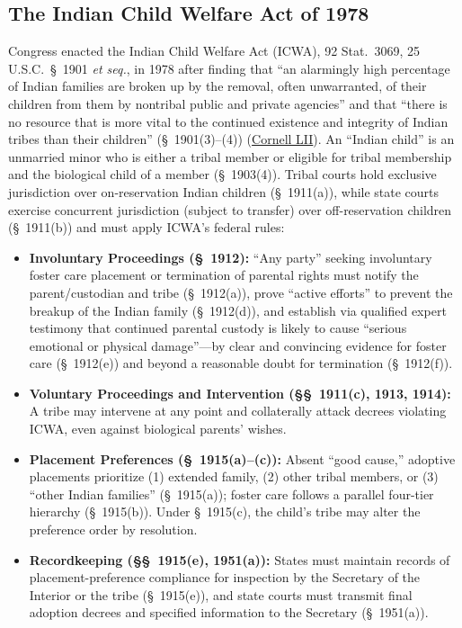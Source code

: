 \documentclass[12pt]{article}
\begin{document}
\subsection{The Indian Child Welfare Act of 1978}
Congress enacted the Indian Child Welfare Act (ICWA), 92 Stat.~3069, 25 U.S.C.~\S~1901 \textit{et seq.}, in 1978 after finding that ``an alarmingly high percentage of Indian families are broken up by the removal, often unwarranted, of their children from them by nontribal public and private agencies'' and that ``there is no resource that is more vital to the continued existence and integrity of Indian tribes than their children'' (\S~1901(3)--(4)) (\href{https://www.law.cornell.edu/supremecourt/text/21-376}{Cornell LII}). An ``Indian child'' is an unmarried minor who is either a tribal member or eligible for tribal membership and the biological child of a member (\S~1903(4)). Tribal courts hold exclusive jurisdiction over on-reservation Indian children (\S~1911(a)), while state courts exercise concurrent jurisdiction (subject to transfer) over off-reservation children (\S~1911(b)) and must apply ICWA's federal rules:
\begin{itemize}
    \item \textbf{Involuntary Proceedings (\S~1912):} ``Any party'' seeking involuntary foster care placement or termination of parental rights must notify the parent/custodian and tribe (\S~1912(a)), prove ``active efforts'' to prevent the breakup of the Indian family (\S~1912(d)), and establish via qualified expert testimony that continued parental custody is likely to cause ``serious emotional or physical damage''---by clear and convincing evidence for foster care (\S~1912(e)) and beyond a reasonable doubt for termination (\S~1912(f)).
    \item \textbf{Voluntary Proceedings and Intervention (\S\S~1911(c), 1913, 1914):} A tribe may intervene at any point and collaterally attack decrees violating ICWA, even against biological parents' wishes.
    \item \textbf{Placement Preferences (\S~1915(a)--(c)):} Absent ``good cause,'' adoptive placements prioritize (1) extended family, (2) other tribal members, or (3) ``other Indian families'' (\S~1915(a)); foster care follows a parallel four-tier hierarchy (\S~1915(b)). Under \S~1915(c), the child's tribe may alter the preference order by resolution.
    \item \textbf{Recordkeeping (\S\S~1915(e), 1951(a)):} States must maintain records of placement-preference compliance for inspection by the Secretary of the Interior or the tribe (\S~1915(e)), and state courts must transmit final adoption decrees and specified information to the Secretary (\S~1951(a)).
\end{itemize}
\end{document}
